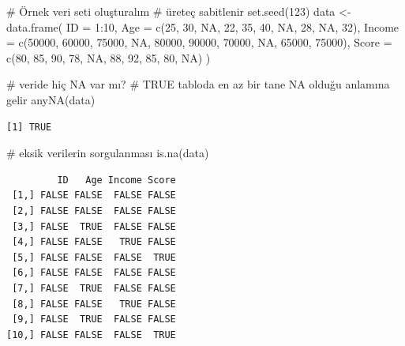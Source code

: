 \documentclass[
  letterpaper,
  DIV=11,
  numbers=noendperiod]{scrreprt}
\newenvironment{Shaded}{\begin{snugshade}}{\end{snugshade}}
\newcommand{\AttributeTok}[1]{\textcolor[rgb]{0.40,0.45,0.13}{#1}}
\newcommand{\CommentTok}[1]{\textcolor[rgb]{0.37,0.37,0.37}{#1}}
\newcommand{\ConstantTok}[1]{\textcolor[rgb]{0.56,0.35,0.01}{#1}}
\newcommand{\DecValTok}[1]{\textcolor[rgb]{0.68,0.00,0.00}{#1}}
\newcommand{\FunctionTok}[1]{\textcolor[rgb]{0.28,0.35,0.67}{#1}}
\newcommand{\NormalTok}[1]{\textcolor[rgb]{0.00,0.23,0.31}{#1}}
\newcommand{\OtherTok}[1]{\textcolor[rgb]{0.00,0.23,0.31}{#1}}
\newcommand{\SpecialCharTok}[1]{\textcolor[rgb]{0.37,0.37,0.37}{#1}}
\begin{document}
\begin{Shaded}
\begin{Highlighting}[]
\CommentTok{\# Örnek veri seti oluşturalım}
\CommentTok{\# üreteç sabitlenir}
\FunctionTok{set.seed}\NormalTok{(}\DecValTok{123}\NormalTok{)}
\NormalTok{data }\OtherTok{\textless{}{-}} \FunctionTok{data.frame}\NormalTok{(}
  \AttributeTok{ID =} \DecValTok{1}\SpecialCharTok{:}\DecValTok{10}\NormalTok{,}
  \AttributeTok{Age =} \FunctionTok{c}\NormalTok{(}\DecValTok{25}\NormalTok{, }\DecValTok{30}\NormalTok{, }\ConstantTok{NA}\NormalTok{, }\DecValTok{22}\NormalTok{, }\DecValTok{35}\NormalTok{, }\DecValTok{40}\NormalTok{, }\ConstantTok{NA}\NormalTok{, }\DecValTok{28}\NormalTok{, }\ConstantTok{NA}\NormalTok{, }\DecValTok{32}\NormalTok{),}
  \AttributeTok{Income =} \FunctionTok{c}\NormalTok{(}\DecValTok{50000}\NormalTok{, }\DecValTok{60000}\NormalTok{, }\DecValTok{75000}\NormalTok{, }\ConstantTok{NA}\NormalTok{, }\DecValTok{80000}\NormalTok{, }\DecValTok{90000}\NormalTok{, }\DecValTok{70000}\NormalTok{, }\ConstantTok{NA}\NormalTok{, }\DecValTok{65000}\NormalTok{, }\DecValTok{75000}\NormalTok{),}
  \AttributeTok{Score =} \FunctionTok{c}\NormalTok{(}\DecValTok{80}\NormalTok{, }\DecValTok{85}\NormalTok{, }\DecValTok{90}\NormalTok{, }\DecValTok{78}\NormalTok{, }\ConstantTok{NA}\NormalTok{, }\DecValTok{88}\NormalTok{, }\DecValTok{92}\NormalTok{, }\DecValTok{85}\NormalTok{, }\DecValTok{80}\NormalTok{, }\ConstantTok{NA}\NormalTok{)}
\NormalTok{)}

\CommentTok{\# veride hiç NA var mı? }
\CommentTok{\# TRUE tabloda en az bir tane NA olduğu anlamına gelir }
\FunctionTok{anyNA}\NormalTok{(data)}
\end{Highlighting}
\end{Shaded}

\begin{verbatim}
[1] TRUE
\end{verbatim}

\begin{Shaded}
\begin{Highlighting}[]
\CommentTok{\# eksik verilerin sorgulanması}
\FunctionTok{is.na}\NormalTok{(data) }
\end{Highlighting}
\end{Shaded}

\begin{verbatim}
         ID   Age Income Score
 [1,] FALSE FALSE  FALSE FALSE
 [2,] FALSE FALSE  FALSE FALSE
 [3,] FALSE  TRUE  FALSE FALSE
 [4,] FALSE FALSE   TRUE FALSE
 [5,] FALSE FALSE  FALSE  TRUE
 [6,] FALSE FALSE  FALSE FALSE
 [7,] FALSE  TRUE  FALSE FALSE
 [8,] FALSE FALSE   TRUE FALSE
 [9,] FALSE  TRUE  FALSE FALSE
[10,] FALSE FALSE  FALSE  TRUE
\end{verbatim}
\end{document}
